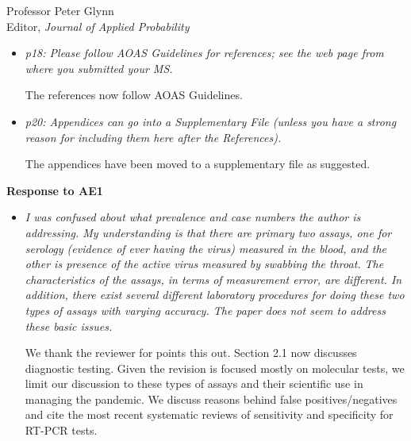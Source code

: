 \documentclass[11pt]{letter} %
\begin{document}
\begin{letter}{Professor
	Peter Glynn\\
	Editor, {\em Journal of Applied Probability}}
\begin{itemize}
\vspace{5mm}
We have fixed all figures to be in grayscale and use different line types.
\vspace{5mm}

\item {\it p18: Please follow AOAS Guidelines for references; see the
web page from where you submitted your MS.}

\vspace{5mm}
The references now follow AOAS Guidelines.
\vspace{5mm}

\item {\it p20: Appendices can go into a Supplementary File (unless
you have a strong reason for including them here after the References).}

\vspace{5mm}
The appendices have been moved to a supplementary file as suggested.
\vspace{5mm}

\end{itemize}
\newpage

{\bf Response to AE1}
\begin{itemize}
\item {\it I was confused about what prevalence and case numbers the author is addressing. My understanding is that there are primary two assays, one for serology (evidence of ever having the virus) measured in the blood, and the other is presence of the active virus measured by swabbing the throat.  The characteristics of the assays, in terms of measurement error, are different.  In addition, there exist several different laboratory procedures for doing these two types of assays with varying accuracy.  The paper does not seem to address these basic issues.}

\vspace{5mm}
We thank the reviewer for points this out. Section 2.1 now discusses diagnostic testing.  Given the revision is focused mostly on molecular tests, we limit our discussion to these types of assays and their scientific use in managing the pandemic.  We discuss reasons behind false positives/negatives and cite the most recent systematic reviews of sensitivity and specificity for RT-PCR tests.
\vspace{5mm}


\end{itemize}
\end{letter}
\end{document}
